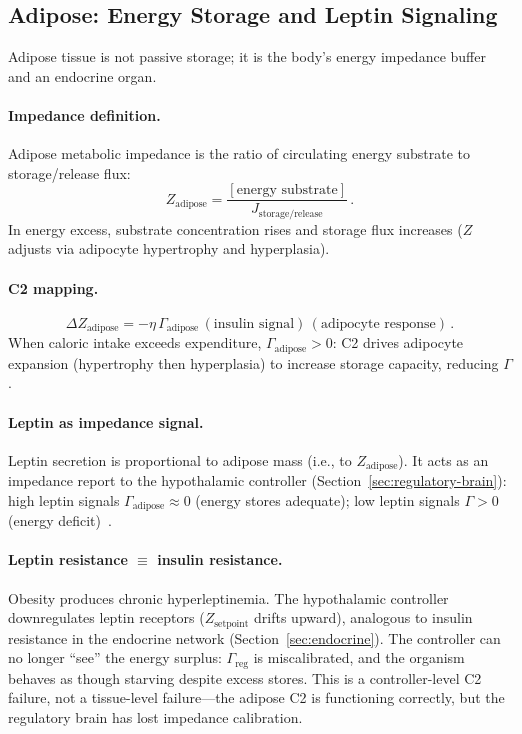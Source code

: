 \documentclass[aps,pre,twocolumn,superscriptaddress,floatfix]{revtex4-2}
\begin{document}
\subsection{Adipose: Energy Storage and Leptin Signaling}
\label{sec:adipose}

Adipose tissue is not passive storage; it is the body's
energy impedance buffer and an endocrine organ.

\paragraph{Impedance definition.}
Adipose metabolic impedance is the ratio of
circulating energy substrate to storage/release flux:
\begin{equation}
  Z_{\text{adipose}} =
  \frac{[\text{energy substrate}]}
       {J_{\text{storage/release}}}\,.
  \label{eq:z-adipose}
\end{equation}
In energy excess, substrate concentration rises and
storage flux increases ($Z$ adjusts via adipocyte
hypertrophy and hyperplasia).

\paragraph{C2 mapping.}
\begin{equation}
  \Delta Z_{\text{adipose}} =
  -\eta\,\Gamma_{\text{adipose}}\,
  (\text{insulin signal})\,
  (\text{adipocyte response})\,.
  \label{eq:c2-adipose}
\end{equation}
When caloric intake exceeds expenditure,
$\Gamma_{\text{adipose}} > 0$: C2 drives
adipocyte expansion (hypertrophy then hyperplasia)
to increase storage capacity, reducing $\Gamma$.

\paragraph{Leptin as impedance signal.}
Leptin secretion is proportional to adipose mass
(i.e., to $Z_{\text{adipose}}$).
It acts as an impedance report to the hypothalamic
controller (Section~\ref{sec:regulatory-brain}):
high leptin signals $\Gamma_{\text{adipose}} \approx 0$
(energy stores adequate);
low leptin signals $\Gamma > 0$
(energy deficit)~\cite{Friedman2019}.

\paragraph{Leptin resistance $\equiv$ insulin resistance.}
Obesity produces chronic hyperleptinemia.
The hypothalamic controller downregulates leptin
receptors ($Z_{\text{setpoint}}$ drifts upward),
analogous to insulin resistance in the endocrine
network (Section~\ref{sec:endocrine}).
The controller can no longer ``see'' the energy
surplus: $\Gamma_{\text{reg}}$ is miscalibrated,
and the organism behaves as though starving despite
excess stores.  This is a controller-level C2 failure,
not a tissue-level failure---the adipose C2 is
functioning correctly, but the regulatory brain
has lost impedance calibration.
\end{document}

